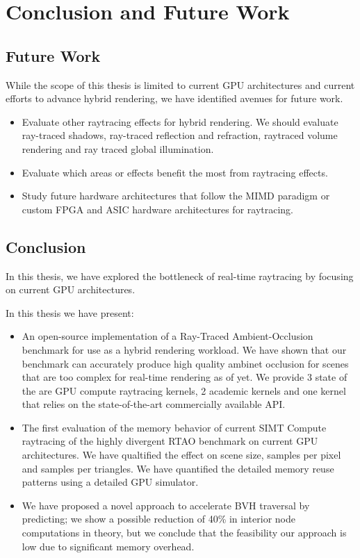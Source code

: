 \chapter{Conclusion and Future Work}
\label{ch:Conclusion}

\section{Future Work}

While the scope of this thesis is limited to current GPU architectures and current efforts to advance hybrid rendering, we have identified avenues for future work.

\begin{itemize}
  \item Evaluate other raytracing effects for hybrid rendering. We should evaluate ray-traced shadows, ray-traced reflection and refraction, raytraced volume rendering and ray traced global illumination. 
  \item Evaluate which areas or effects benefit the most from raytracing effects.
  \item Study future hardware architectures that follow the MIMD paradigm or custom FPGA and ASIC hardware architectures for raytracing.
\end{itemize}

\section{Conclusion}

In this thesis, we have explored the bottleneck of real-time raytracing by focusing on current GPU architectures.

In this thesis we have present:
\begin{itemize}
  \item An open-source implementation of a Ray-Traced Ambient-Occlusion benchmark for use as a hybrid rendering workload. We have shown that our benchmark can accurately produce high quality ambinet occlusion for scenes that are too complex for real-time rendering as of yet. We provide 3 state of the are GPU compute raytracing kernels, 2 academic kernels and one kernel that relies on the state-of-the-art commercially available API. 
  \item The first evaluation of the memory behavior of current SIMT Compute raytracing of the highly divergent RTAO benchmark on current GPU architectures. We have qualtified the effect on scene size, samples per pixel and samples per triangles. We have quantified the detailed memory reuse patterns using a detailed GPU simulator.
  \item We have proposed a novel approach to accelerate BVH traversal by predicting; we show a possible reduction of 40\% in interior node computations in theory, but we conclude that the feasibility our approach is low due to significant memory overhead.
\end{itemize}

